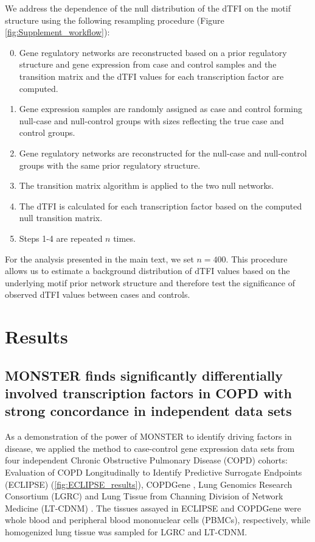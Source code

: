 We address the dependence of the null distribution of the dTFI on the motif structure using the following resampling procedure (Figure \ref{fig:Supplement_workflow}):
\begin{enumerate}
\setcounter{enumi}{-1}
\item Gene regulatory networks are reconstructed based on a prior regulatory structure and gene expression from case and control samples and the transition matrix and the dTFI values for each transcription factor are computed.
\item Gene expression samples are randomly assigned as case and control forming null-case and null-control groups with sizes reflecting the true case and control groups. 
\item Gene regulatory networks are reconstructed for the null-case and null-control groups with the same prior regulatory structure. 
\item The transition matrix algorithm is applied to the two null networks. 
\item The dTFI is calculated for each transcription factor based on the computed null transition matrix. 
\item  Steps 1-4 are repeated $n$ times. 
\end{enumerate}

For the analysis presented in the main text, we set $n=400$. This procedure allows us to estimate a background distribution of dTFI values based on the underlying motif prior network structure and therefore test the significance of observed dTFI values between cases and controls. 

\section*{Results}

\subsection*{MONSTER finds significantly differentially involved transcription factors in COPD with strong concordance in independent data sets}

As a demonstration of the power of MONSTER to identify driving factors in disease, we applied the method to case-control gene expression data sets from four independent Chronic Obstructive Pulmonary Disease (COPD) cohorts: Evaluation of COPD Longitudinally to Identify Predictive Surrogate Endpoints (ECLIPSE) \cite{singh2014altered}\cite{vestbo2008evaluation} (\ref{fig:ECLIPSE_results}), COPDGene  \cite{regan2011genetic} \cite{bahr2013peripheral} \cite{pillai2009genome}, Lung Genomics Research Consortium (LGRC) \cite{lgrc} and Lung Tissue from Channing Division of Network Medicine (LT-CDNM) \cite{qiu2015network}. The tissues assayed in ECLIPSE and COPDGene were whole blood and peripheral blood mononuclear cells (PBMCs), respectively, while homogenized lung tissue was sampled for LGRC and LT-CDNM. 

